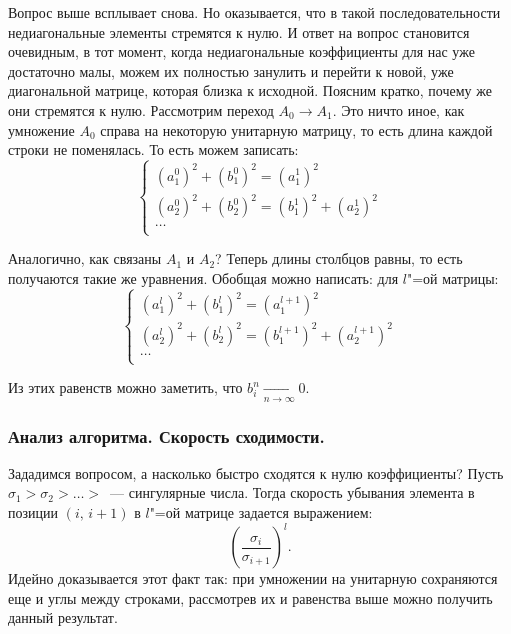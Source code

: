 \begin{enumerate}[label=\protect\circled{\arabic*}]
          Вопрос выше всплывает снова. Но оказывается, что в такой последовательности недиагональные элементы стремятся к нулю.
          И ответ на вопрос становится очевидным, в тот момент, когда недиагональные коэффициенты для нас уже достаточно малы, можем их полностью занулить
          и перейти к новой, уже диагональной матрице, которая близка к исходной. Поясним кратко, почему же они стремятся к нулю.
          Рассмотрим переход $A_0\rightarrow A_1$. Это ничто иное, как умножение $A_0$ справа на некоторую унитарную матрицу, то есть длина каждой
          строки не поменялась. То есть можем записать:
          \[
              \begin{cases}
                  (a_1^0)^2+(b_1^0)^2 =(a_1^1)^2             \\
                  (a_2^0)^2+(b_2^0)^2 =(b_1^1)^2 + (a_2^1)^2 \\
                  \ldots                                     \\
              \end{cases}
          \]

          Аналогично, как связаны $A_1$ и $A_2$? Теперь длины столбцов равны, то есть получаются такие же уравнения. Обобщая можно написать:
          для $l$"=ой матрицы:
          \[
              \begin{cases}
                  (a_1^l)^2+(b_1^l)^2 =(a_1^{l+1})^2                 \\
                  (a_2^l)^2+(b_2^l)^2 =(b_1^{l+1})^2 + (a_2^{l+1})^2 \\
                  \ldots                                             \\
              \end{cases}
          \]

          Из этих равенств можно заметить, что $b_i^n\xrightarrow[n\rightarrow\infty]{}0$.

\end{enumerate}

\subsubsection{Анализ алгоритма. Скорость сходимости.}

Зададимся вопросом, а насколько быстро сходятся к нулю коэффициенты? Пусть $\sigma_1>\sigma_2>\ldots>$~--- сингулярные числа.
Тогда скорость убывания элемента в позиции $(i,\, i + 1)$ в $l$"=ой матрице задается выражением:
\[
    \left(\dfrac{\sigma_{i}}{\sigma_{i+1}}\right)^l.
\]
Идейно доказывается этот факт так: при умножении на унитарную сохраняются еще и углы между строками, рассмотрев их и равенства выше
можно получить данный результат.

